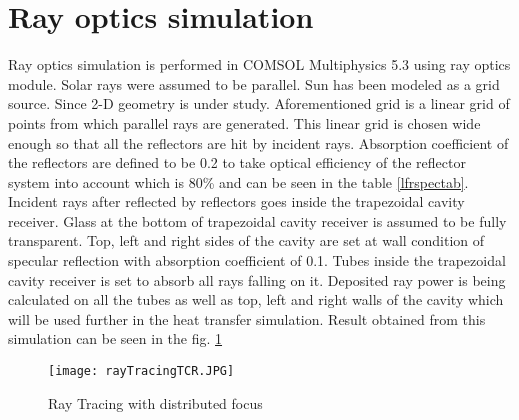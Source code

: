 \section{Ray optics simulation}\label{sec:rayopsim}
Ray optics simulation is performed in COMSOL Multiphysics 5.3 using ray optics module. Solar rays were assumed to be parallel. Sun has been modeled as a grid source. Since 2-D geometry is under study. Aforementioned grid is a linear grid of points from which parallel rays are generated. This linear grid is chosen wide enough so that all the reflectors are hit by incident rays. Absorption coefficient of the reflectors are defined to be 0.2 to take optical efficiency of the reflector system into account which is 80\% and can be seen in the table \ref{lfrspectab}. Incident rays after reflected by reflectors goes inside the trapezoidal cavity receiver. Glass at the bottom of trapezoidal cavity receiver is assumed to be fully transparent. Top, left and right sides of the cavity are set at wall condition of specular reflection with absorption coefficient of 0.1. Tubes inside the trapezoidal cavity receiver is set to absorb all rays falling on it. Deposited ray power is being calculated on all the tubes as well as top, left and right walls of the cavity which will be used further in the heat transfer simulation. Result obtained from this simulation can be seen in the fig. \ref{rayTracingTCR}

\begin{figure}[H]
\begin{center}
  \texttt{[image: rayTracingTCR.JPG]}
\caption{Ray Tracing with distributed focus}
\end{center}
\label{rayTracingTCR}
\end{figure}

